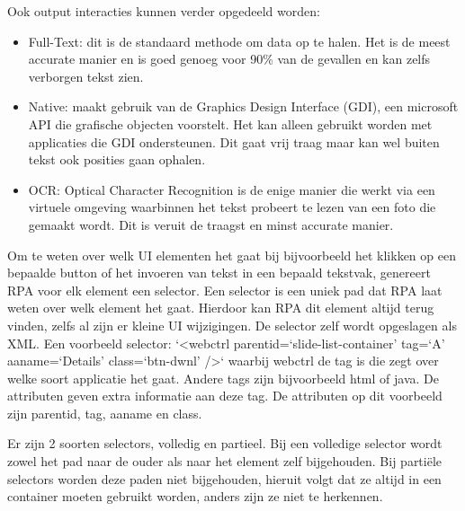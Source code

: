 Ook output interacties kunnen verder opgedeeld worden:
\begin{itemize}
	\item Full-Text: dit is de standaard methode om data op te halen. Het is de meest accurate manier en is goed genoeg voor 90\% van de gevallen en kan zelfs verborgen tekst zien.
	\item Native: maakt gebruik van de Graphics Design Interface (GDI), een microsoft API die grafische objecten voorstelt. Het kan alleen gebruikt worden met applicaties die GDI ondersteunen. Dit gaat vrij traag maar kan wel buiten tekst ook posities gaan ophalen.
	\item OCR: Optical Character Recognition is de enige manier die werkt via een virtuele omgeving waarbinnen het tekst probeert te lezen van een foto die gemaakt wordt. Dit is veruit de traagst en minst accurate manier.
\end{itemize}

Om te weten over welk UI elementen het gaat bij bijvoorbeeld het klikken op een bepaalde button of het invoeren van tekst in een bepaald tekstvak, genereert RPA voor elk element een selector. Een selector is een uniek pad dat RPA laat weten over welk element het gaat. Hierdoor kan RPA dit element altijd terug vinden, zelfs al zijn er kleine UI wijzigingen. De selector zelf wordt opgeslagen als XML. Een voorbeeld selector: `<webctrl parentid=‘slide-list-container’ tag=‘A’ aaname=‘Details’ class=‘btn-dwnl’ />` waarbij webctrl de tag is die zegt over welke soort applicatie het gaat. Andere tags zijn bijvoorbeeld html of java. De attributen geven extra informatie aan deze tag. De attributen op dit voorbeeld zijn parentid, tag, aaname en class.

Er zijn 2 soorten selectors, volledig en partieel. Bij een volledige selector wordt zowel het pad naar de ouder als naar het element zelf bijgehouden. Bij partiële selectors worden deze paden niet bijgehouden, hieruit volgt dat ze altijd in een container moeten gebruikt worden, anders zijn ze niet te herkennen.


